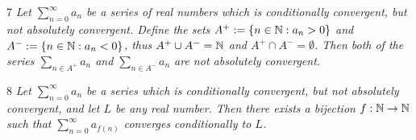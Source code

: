 \begin{lemma}{7}
    \label{conditional-pos-neg-diverge}
    \emph{Let $\sum_{n=0}^{\infty} a_n$ be a series of real numbers which is conditionally
    convergent, but not absolutely convergent. Define the sets $A^+ := \{n \in \mathbb{N} : a_n > 0\}$
    and $A^- := \{n \in \mathbb{N} : a_n < 0\}$, thus $A^+ \cup A^- = \mathbb{N}$ and $A^+ \cap A^- = \emptyset$.
    Then both of the series $\sum_{n \in A^+} a_n$ and $\sum_{n \in A^-} a_n$ are not absolutely convergent.}
\end{lemma}

\begin{theorem}{8}
    \label{riemann-rearrangement}
    \emph{Let $\sum_{n=0}^{\infty} a_n$ be a series which is conditionally convergent,
    but not absolutely convergent, and let $L$ be any real number. Then there exists
    a bijection $f: \mathbb{N} \to \mathbb{N}$ such that $\sum_{n=0}^{\infty} a_{f(n)}$
    converges conditionally to $L$.}
\end{theorem}
